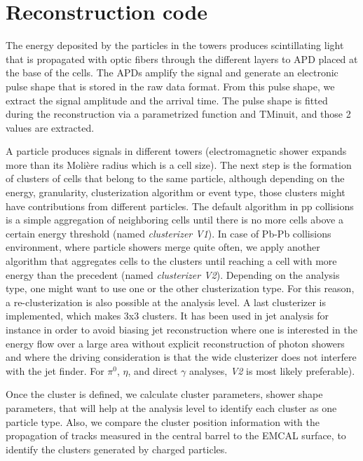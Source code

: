 

\section{Reconstruction code}


The energy deposited by the particles in the towers produces scintillating light that is propagated with optic fibers through the different layers to APD placed at the base of the cells. The APDs amplify the signal and generate an electronic pulse shape that is stored in the raw data format. From this pulse shape, we extract the signal amplitude and the arrival time. The pulse shape is fitted during the reconstruction via a parametrized function and TMinuit, and those 2 values are extracted.

A particle produces signals in different towers (electromagnetic shower expands more than its Moli\`ere radius which is a cell size). The next step is the formation of clusters of cells that belong to the same particle, although depending on the energy, granularity, clusterization algorithm or event type, those clusters might have contributions from different particles. The default algorithm in pp collisions is a simple aggregation of neighboring cells until there is no more cells above a certain energy threshold (named {\it clusterizer V1}). In case of Pb-Pb collisions environment, where particle showers merge quite often, we apply another algorithm that aggregates cells to the clusters until reaching a cell with more energy than the precedent (named {\it clusterizer V2}). Depending on the analysis type, one might want to use one or the other clusterization type. For this reason, a re-clusterization is also possible at the analysis level. A last clusterizer is implemented, which makes 3x3 clusters. It has been used in jet analysis for instance in order to avoid biasing jet reconstruction where one is interested in the energy flow over a large area without explicit reconstruction of photon showers and where the driving consideration is that the wide clusterizer does not interfere with the jet finder. For $\pi^{0}$, $\eta$, and direct $\gamma$ analyses, {\it V2} is most likely preferable).

Once the cluster is defined, we calculate cluster parameters, shower shape parameters, that will help at the analysis level to identify each cluster as one particle type. Also, we compare the cluster position information with the propagation of tracks measured in the central barrel to the EMCAL surface, to identify the clusters generated by charged particles.

